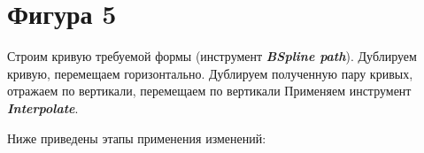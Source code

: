 \newpage
\section[Фигура 5]{Фигура 5}

Строим кривую требуемой формы (инструмент \textit{\textbf{BSpline path}}). 
Дублируем кривую, перемещаем горизонтально.
Дублируем полученную пару кривых, отражаем по вертикали, перемещаем по вертикали
Применяем инструмент \textit{\textbf{Interpolate}}.
\vspace{12pt}

Ниже приведены этапы применения изменений:
\begin{figure}[H]
    \begin{minipage}[h]{1\linewidth}
    \end{minipage}
\end{figure}
